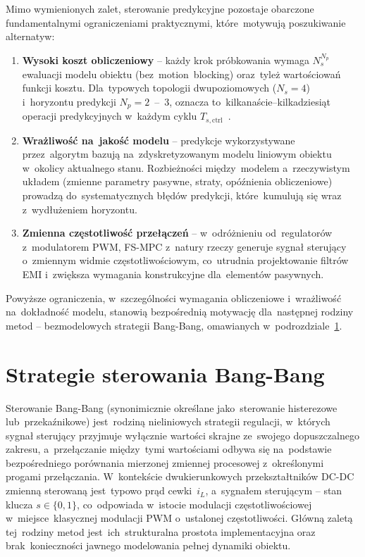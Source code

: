 Mimo wymienionych zalet, sterowanie predykcyjne pozostaje obarczone fundamentalnymi ograniczeniami praktycznymi, które~motywują poszukiwanie alternatyw:
\begin{enumerate}
    \item \textbf{Wysoki koszt obliczeniowy} -- każdy krok próbkowania wymaga $N_s^{N_p}$ ewaluacji modelu obiektu (bez~motion~blocking) oraz~tyleż wartościowań funkcji kosztu. Dla~typowych topologii dwupoziomowych ($N_s = 4$) i~horyzontu predykcji $N_p = 2$~--~3, oznacza to~kilkanaście--kilkadziesiąt operacji predykcyjnych w~każdym cyklu $T_{s,\mathrm{ctrl}}$~\cite{tatari2025splitcost}.
    \item \textbf{Wrażliwość na~jakość modelu} -- predykcje wykorzystywane przez~algorytm bazują na~zdyskretyzowanym modelu liniowym obiektu w~okolicy aktualnego stanu. Rozbieżności między~modelem a~rzeczywistym układem (zmienne parametry pasywne, straty, opóźnienia obliczeniowe) prowadzą do~systematycznych błędów predykcji, które~kumulują się wraz z~wydłużeniem horyzontu.
    \item \textbf{Zmienna częstotliwość przełączeń} -- w~odróżnieniu od~regulatorów z~modulatorem PWM, FS-MPC z~natury rzeczy generuje sygnał sterujący o~zmiennym widmie częstotliwościowym, co~utrudnia projektowanie filtrów EMI i~zwiększa wymagania konstrukcyjne dla~elementów pasywnych.
\end{enumerate}

Powyższe ograniczenia, w~szczególności wymagania obliczeniowe i~wrażliwość na~dokładność modelu, stanowią bezpośrednią motywację dla~następnej rodziny metod -- bezmodelowych strategii Bang-Bang, omawianych w~podrozdziale~\ref{sec:bb}.

\section{Strategie sterowania Bang-Bang}
\label{sec:bb}

Sterowanie Bang-Bang (synonimicznie określane jako~sterowanie histerezowe lub~przekaźnikowe) jest~rodziną nieliniowych strategii regulacji, w~których sygnał sterujący przyjmuje wyłącznie wartości skrajne ze~swojego dopuszczalnego zakresu, a~przełączanie między~tymi wartościami odbywa się na~podstawie bezpośredniego porównania mierzonej zmiennej procesowej z~określonymi progami przełączania. W~kontekście dwukierunkowych przekształtników DC-DC zmienną sterowaną jest~typowo prąd cewki~$i_L$, a~sygnałem sterującym -- stan klucza $s\in\{0,1\}$, co~odpowiada w~istocie modulacji częstotliwościowej w~miejsce~klasycznej modulacji PWM o~ustalonej częstotliwości. Główną zaletą tej~rodziny metod jest~ich~strukturalna prostota implementacyjna oraz brak~konieczności jawnego modelowania pełnej dynamiki obiektu.

